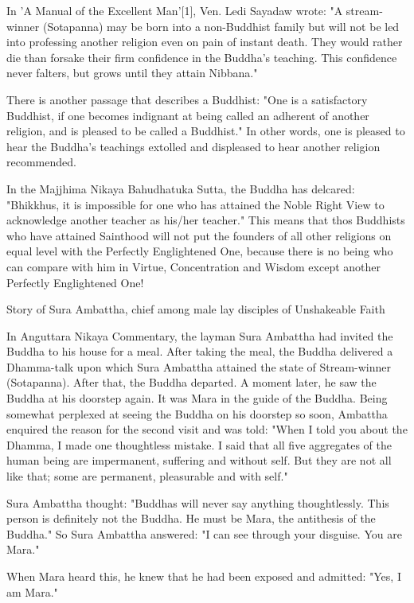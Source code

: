 In 'A Manual of the Excellent Man'[1], Ven. Ledi Sayadaw wrote: "A stream-winner (Sotapanna) may be born into a non-Buddhist family but will not be led into professing another religion even on pain of instant death. They would rather die than forsake their firm confidence in the Buddha's teaching. This confidence never falters, but grows until they attain Nibbana."

There is another passage that describes a Buddhist: "One is a satisfactory Buddhist, if one becomes indignant at being called an adherent of another religion, and is pleased to be called a Buddhist." In other words, one is pleased to hear the Buddha's teachings extolled and displeased to hear another religion recommended.

In the Majjhima Nikaya Bahudhatuka Sutta, the Buddha has delcared: "Bhikkhus, it is impossible for one who has attained the Noble Right View to acknowledge another teacher as his/her teacher." This means that thos Buddhists who have attained Sainthood will not put the founders of all other religions on equal level with the Perfectly Englightened One, because there is no being who can compare with him in Virtue, Concentration and Wisdom except another Perfectly Englightened One!

Story of Sura Ambattha, chief among male lay disciples of Unshakeable Faith

In Anguttara Nikaya Commentary, the layman Sura Ambattha had invited the Buddha to his house for a meal. After taking the meal, the Buddha delivered a Dhamma-talk upon which Sura Ambattha attained the state of Stream-winner (Sotapanna). After that, the Buddha departed. A moment later, he saw the Buddha at his doorstep again. It was Mara in the guide of the Buddha. Being somewhat perplexed at seeing the Buddha on his doorstep so soon, Ambattha enquired the reason for the second visit and was told: "When I told you about the Dhamma, I made one thoughtless mistake. I said that all five aggregates of the human being are impermanent, suffering and without self. But they are not all like that; some are permanent, pleasurable and with self."

Sura Ambattha thought: "Buddhas will never say anything thoughtlessly. This person is definitely not the Buddha. He must be Mara, the antithesis of the Buddha." So Sura Ambattha answered: "I can see through your disguise. You are Mara."

When Mara heard this, he knew that he had been exposed and admitted: "Yes, I am Mara."

